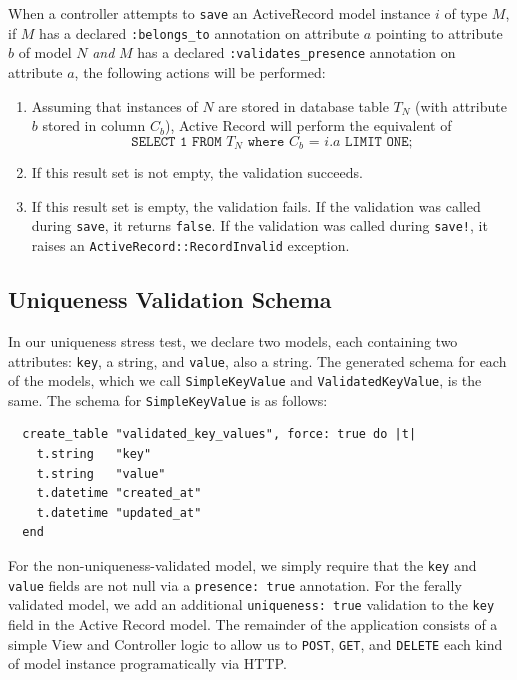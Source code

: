  When a controller attempts to \texttt{save} an ActiveRecord model instance $i$ of type $M$, if $M$ has a declared \texttt{:belongs\_to} annotation on attribute $a$ pointing to attribute $b$ of model $N$ \textit{and} $M$ has a declared \texttt{:validates\_presence} annotation on attribute $a$, the following actions will be performed:

\begin{enumerate} 
\small
\item Assuming that instances of $N$ are stored in database table $T_N$ (with attribute $b$ stored in column $C_b$), Active Record will perform the equivalent of $$\texttt{SELECT 1 FROM $T_N$ where $C_b$ = $i.a$ LIMIT ONE;}$$

\item If this result set is not empty, the validation succeeds.

\item If this result set is empty, the validation fails. If the validation was called during \texttt{save}, it returns \texttt{false}. If the validation was called during \texttt{save!}, it raises an \texttt{ActiveRecord::RecordInvalid} exception.

\end{enumerate}

\lstset{language=Ruby,basicstyle=\ttfamily\small,columns=fullflexible,frame=single}

\subsection{Uniqueness Validation Schema}
\label{sec:appendix-uniqueness-schema}

In our uniqueness stress test, we declare two models, each containing two attributes: \texttt{key}, a string, and \texttt{value}, also a string. The generated schema for each of the models, which we call \texttt{SimpleKeyValue} and \texttt{ValidatedKeyValue}, is the same. The schema for \texttt{SimpleKeyValue} is as follows:
\begin{lstlisting}
  create_table "validated_key_values", force: true do |t|
    t.string   "key"
    t.string   "value"
    t.datetime "created_at"
    t.datetime "updated_at"
  end
\end{lstlisting}
For the non-uniqueness-validated model, we simply require that the \texttt{key} and \texttt{value} fields are not null via a \texttt{presence: true} annotation.  For the ferally validated model, we add an additional \texttt{uniqueness: true} validation to the \texttt{key} field in the Active Record model. The remainder of the application consists of a simple View and Controller logic to allow us to \texttt{POST}, \texttt{GET}, and \texttt{DELETE} each kind of model instance programatically via HTTP.



